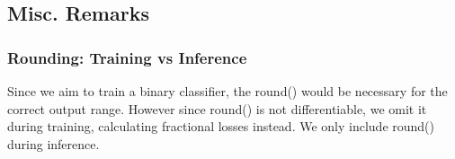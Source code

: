 \documentclass{article}
\begin{document}
\subsection{Misc. Remarks}
\subsubsection{Rounding: Training vs Inference} Since we aim to train a binary classifier, the round() would be necessary for the correct output range. However since round() is not differentiable, we omit it during training, calculating fractional losses instead. We only include round() during inference.
\end{document}

